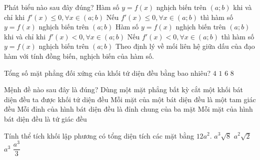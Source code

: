 \begin{ex}%
Phát biểu nào sau đây đúng?
\choice
{Hàm số $y= f(x)$ nghịch biến trên $(a; b)$ khi và chỉ khi $f'(x) \leq 0, \forall  x \in (a; b)$}
{Nếu $f'(x) \leq 0, \forall  x \in (a; b)$ thì hàm số $y = f(x)$ nghịch biến trên $(a; b)$}
{Hàm số $y= f(x)$ nghịch biến trên $(a; b)$ khi và chỉ khi $f'(x) < 0, \forall  x \in (a; b)$}
{\True Nếu $f'(x) < 0, \forall  x \in (a; b)$ thì hàm số $y= f(x)$ nghịch biến trên $(a; b)$}
\loigiai
{
Theo định lý về mối liên hệ giữa dấu của đạo hàm với tính đồng biến, nghịch biến của hàm số.
}
\end{ex}


\begin{ex}%
Tổng số mặt phẳng đối xứng của khối tứ diện đều bằng bao nhiêu?
\choice
{$4$}
{$1$}
{\True $6$}
{$8$}
\end{ex}


\begin{ex}%
Mệnh đề nào sau đây là đúng?
\choice
{Dùng một mặt phẳng bất kỳ cắt một khối bát diện đều ta được khối tứ diện đều}
{\True Mỗi mặt của một bát diện đều là một tam giác đều}
{Mỗi đỉnh của hình bát diện đều là đỉnh chung của ba mặt}
{Mỗi mặt của hình bát diện đều là tứ giác đều}
\loigiai{
}
\end{ex}


\begin{ex}%
Tính thể tích khối lập phương có tổng diện tích các mặt bằng $12a^2$.
\choice
{\True $a^3\sqrt{8}$}
{$a^2\sqrt{2}$}
{$a^3$}
{$\dfrac{a^3}{3}$}
\end{ex}


